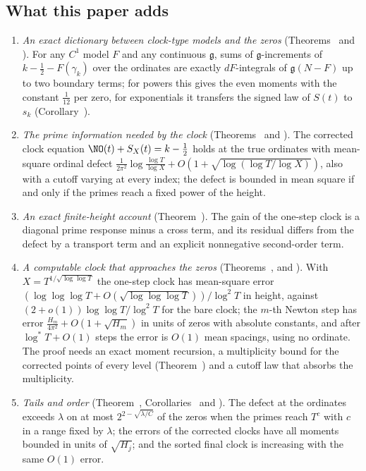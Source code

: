 \subsection{What this paper adds}
\begin{sloppypar}
\begin{enumerate}[leftmargin=1.6em]
\item \emph{An exact dictionary between clock-type models and the zeros} (Theorems~ and ). For any $C^1$ model $F$ and any continuous $\mathfrak g$, sums of $\mathfrak g$-increments of $k-\frac12-F(\gamma_k)$ over the ordinates are exactly $dF$-integrals of $\mathfrak g(N-F)$ up to two boundary terms; for powers this gives the even moments with the constant $\frac1{12}$ per zero, for exponentials it transfers the signed law of $S(t)$ to $s_k$ (Corollary~).
\item \emph{The prime information needed by the clock} (Theorems~ and ). The corrected clock equation $\NO(t)+S_X(t)=k-\frac12$ holds at the true ordinates with mean-square ordinal defect $\frac1{2\pi^2}\log\frac{\log T}{\log X}+O(1+\sqrt{\log(\log T/\log X)})$, also with a cutoff varying at every index; the defect is bounded in mean square if and only if the primes reach a fixed power of the height.
\item \emph{An exact finite-height account} (Theorem~). The gain of the one-step clock is a diagonal prime response minus a cross term, and its residual differs from the defect by a transport term and an explicit nonnegative second-order term.
\item \emph{A computable clock that approaches the zeros} (Theorems~,  and ). With $X=T^{1/\sqrt{\log\log T}}$ the one-step clock has mean-square error $(\log\log\log T+O(\sqrt{\log\log\log T}))/\log^2T$ in height, against $(2+o(1))\log\log T/\log^2T$ for the bare clock; the $m$-th Newton step has error $\frac{H_m}{4\pi^2}+O(1+\sqrt{H_m})$ in units of zeros with absolute constants, and after $\log^*T+O(1)$ steps the error is $O(1)$ mean spacings, using no ordinate. The proof needs an exact moment recursion, a multiplicity bound for the corrected points of every level (Theorem~) and a cutoff law that absorbs the multiplicity.
\item \emph{Tails and order} (Theorem~, Corollaries~ and ). The defect at the ordinates exceeds $\lambda$ on at most $2^{2-\sqrt{\lambda/C}}$ of the zeros when the primes reach $T^{c}$ with $c$ in a range fixed by $\lambda$; the errors of the corrected clocks have all moments bounded in units of $\sqrt{H_j}$; and the sorted final clock is increasing with the same $O(1)$ error.

\end{enumerate}
\end{sloppypar}
